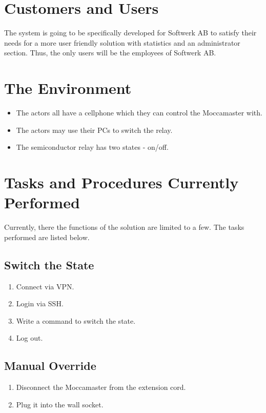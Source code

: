 \section{Customers and Users}

The system is going to be specifically developed for Softwerk AB to satisfy their needs for a more user friendly solution with statistics and an administrator section. Thus, the only users will be the employees of Softwerk AB.

\section{The Environment}

\begin{itemize}

\item The actors all have a cellphone which they can control the Moccamaster with.
\item The actors may use their PCs to switch the relay.
\item The semiconductor relay has two states - on/off.

\end{itemize}

\section{Tasks and Procedures Currently Performed}

Currently, there the functions of the solution are limited to a few. The tasks performed are listed below.

\subsection{Switch the State}

\begin{enumerate}
\item Connect via VPN.
\item Login via SSH.
\item Write a command to switch the state.
\item Log out.
\end{enumerate}

\subsection{Manual Override}
\begin{enumerate}
\item Disconnect the Moccamaster from the extension cord.
\item Plug it into the wall socket.
\end{enumerate}

